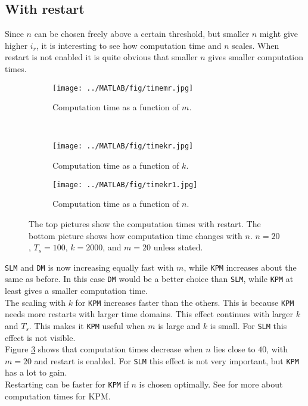 \subsection{With restart}
Since $n$ can be chosen freely above a certain threshold, but smaller $n$ might give higher $i_r$, it is interesting to see how computation time and $n$ scales. When restart is not enabled it is quite obvious that smaller $n$ gives smaller computation times.\\
\begin{figure}[H]
        \centering
        \begin{subfigure}[b]{0.45\textwidth}
                \texttt{[image: ../MATLAB/fig/timemr.jpg]}
                \caption{ Computation time as a function of $m$. }
                \label{fig:timemr}
        \end{subfigure}
        ~
        \begin{subfigure}[b]{0.45\textwidth}
                \texttt{[image: ../MATLAB/fig/timekr.jpg]}
                \caption{ Computation time as a function of $k$. }
                \label{fig:timekr}
        \end{subfigure}
        
        \begin{subfigure}[b]{0.45\textwidth}
                \texttt{[image: ../MATLAB/fig/timekr1.jpg]}
                \caption{ Computation time as a function of $n$. }
                \label{fig:timekr1}
        \end{subfigure}        
        
        \caption{ The top pictures show the computation times with restart. The bottom picture shows how computation time changes with $n$. $n = 20$, $T_s = 100$, $k = 2000$, and $m = 20$ unless stated. }
        \label{fig:time1}
\end{figure}

\texttt{SLM} and \texttt{DM} is now increasing equally fast with $m$, while \texttt{KPM} increases about the same as before. In this case \texttt{DM} would be a better choice than \texttt{SLM}, while \texttt{KPM} at least gives a smaller computation time. \\
The scaling with $k$ for \texttt{KPM} increases faster than the others. This is because \texttt{KPM} needs more restarts with larger time domains. This effect continues with larger $k$ and $ T_s $. This makes it \texttt{KPM} useful when $m$ is large and $k$ is small. For \texttt{SLM} this effect is not visible. \\
Figure \ref{fig:timekr1} shows that computation times decrease when $n$ lies close to $40$, with $m = 20$ and restart is enabled. For \texttt{SLM} this effect is not very important, but \texttt{KPM} has a lot to gain. \\
Restarting can be faster for \texttt{KPM} if $n$ is chosen optimally. See \cite{min} for more about computation times for KPM.

